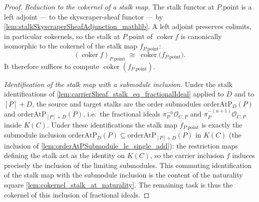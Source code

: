 \begin{proof}
  \emph{Reduction to the cokernel of a stalk map.} The stalk functor at
  \(P.\mathrm{point}\) is a left adjoint --- to the skyscraper-sheaf functor ---
  by \cref{lem:stalkSkyscraperSheafAdjunction_mathlib}. A left adjoint preserves
  colimits, in particular cokernels, so the stalk at \(P.\mathrm{point}\) of
  \(\operatorname{coker} f\) is canonically isomorphic to the cokernel of the
  stalk map \(f_{P.\mathrm{point}}\):
  \[
    (\operatorname{coker} f)_{P.\mathrm{point}} \;\cong\;
    \operatorname{coker}\!\bigl(f_{P.\mathrm{point}}\bigr).
  \]
  It therefore suffices to compute \(\operatorname{coker}(f_{P.\mathrm{point}})\).

  \emph{Identification of the stalk map with a submodule inclusion.} Under the
  stalk identifications of \cref{lem:carrierSheaf_stalk_eq_fractionalIdeal}
  applied to \(D\) and to \([P]+D\), the source and target stalks are the order
  submodules \(\mathrm{orderAtP}_D(P)\) and \(\mathrm{orderAtP}_{[P]+D}(P)\),
  i.e.\ the fractional ideals \(\pi_P^{-n}\mathcal O_{C,P}\) and
  \(\pi_P^{-(n+1)}\mathcal O_{C,P}\) inside \(K(C)\). Under these
  identifications the stalk map \(f_{P.\mathrm{point}}\) is exactly the submodule
  inclusion
  \(\mathrm{orderAtP}_D(P) \subseteq \mathrm{orderAtP}_{[P]+D}(P)\) in \(K(C)\)
  (the inclusion of \cref{lem:orderAtPSubmodule_le_single_add}): the restriction
  maps defining the stalk act as the identity on \(K(C)\), so the carrier
  inclusion \(f\) induces precisely the inclusion of the limiting submodules.
  This commuting identification of the stalk map with the submodule inclusion is
  the content of the naturality square
  \cref{lem:cokernel_stalk_at_naturality}. The remaining task is thus the
  cokernel of this inclusion of fractional ideals.


\end{proof}

